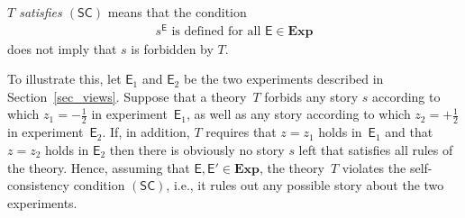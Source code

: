\documentclass[12pt]{article}
\theoremstyle{plain}
\theoremstyle{definition}
\newcommand*{\cE}{\mathcal{E}}
\newcommand*{\Exp}{\mathsf{E}}
\newcommand*{\Expp}{\mathsf{E'}}
\newcommand*{\Expone}{\mathsf{E}_1}
\newcommand*{\Exptwo}{\mathsf{E}_2}
\newcommand*{\allExp}{\mathbf{Exp}}
\newcommand*{\sminus}{{\textstyle - \frac{1}{2}}}
\newcommand*{\splus}{{\textstyle + \frac{1}{2}}}
\newcommand*{\SelfCons}{\mathsf{(SC)}}
\begin{document}
\begin{shaded}
  \noindent \emph{$T$ satisfies $\SelfCons$} means that the condition  
  \begin{align*}
      s^{\Exp} \text{ is defined for all }   \Exp \in \allExp 
  \end{align*}
  does not imply that $s$ is forbidden by $T$. 
\end{shaded}


To illustrate this, let $\Expone$ and $\Exptwo$ be the two experiments described in Section~\ref{sec_views}. Suppose that a theory~$T$ forbids any story $s$ according to which $z_1 = \sminus$ in experiment~$\Expone$, as well as any story according to which $z_2 = \splus$ in experiment~$\Exptwo$. If, in addition, $T$ requires that $z = z_1$ holds in~$\Expone$ and that $z = z_2$ holds in $\Exptwo$ then there is obviously no story $s$ left that satisfies all rules of the theory.  Hence, assuming that $\Exp, \Expp \in \allExp$, the theory~$T$ violates the self-consistency condition $\SelfCons$, i.e., it rules out any possible story about the two experiments.




%
\end{document}
